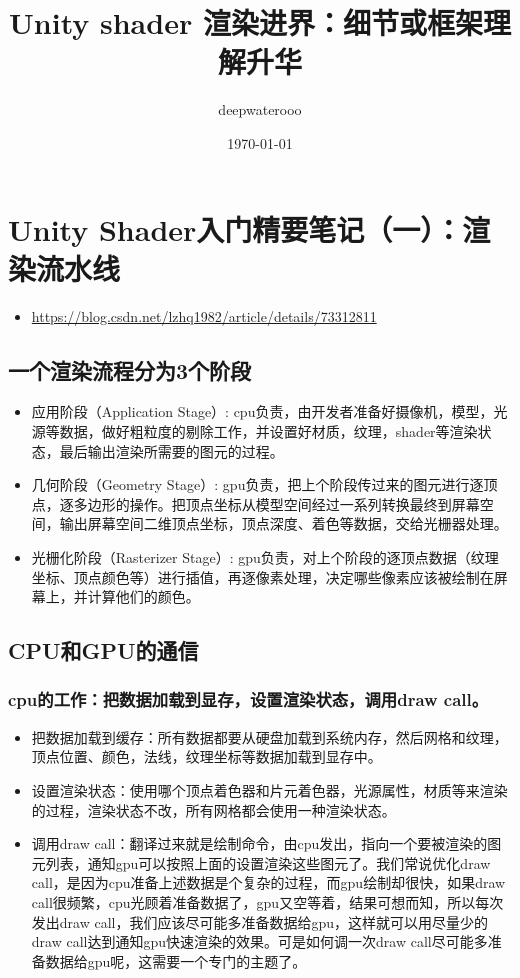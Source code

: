 \documentclass[9pt, b5paper]{article}
\author{deepwaterooo}
\date{\today}
\title{Unity shader 渲染进界：细节或框架理解升华}
\begin{document}
\maketitle
\tableofcontents


\section{Unity Shader入门精要笔记（一）：渲染流水线}
\label{sec-1}
\begin{itemize}
\item \url{https://blog.csdn.net/lzhq1982/article/details/73312811}
\end{itemize}
\subsection{一个渲染流程分为3个阶段}
\label{sec-1-1}
\begin{itemize}
\item 应用阶段（Application Stage）: cpu负责，由开发者准备好摄像机，模型，光源等数据，做好粗粒度的剔除工作，并设置好材质，纹理，shader等渲染状态，最后输出渲染所需要的图元的过程。
\item 几何阶段（Geometry Stage）: gpu负责，把上个阶段传过来的图元进行逐顶点，逐多边形的操作。把顶点坐标从模型空间经过一系列转换最终到屏幕空间，输出屏幕空间二维顶点坐标，顶点深度、着色等数据，交给光栅器处理。
\item 光栅化阶段（Rasterizer Stage）: gpu负责，对上个阶段的逐顶点数据（纹理坐标、顶点颜色等）进行插值，再逐像素处理，决定哪些像素应该被绘制在屏幕上，并计算他们的颜色。
\end{itemize}
\subsection{CPU和GPU的通信}
\label{sec-1-2}
\subsubsection{cpu的工作：把数据加载到显存，设置渲染状态，调用draw call。}
\label{sec-1-2-1}
\begin{itemize}
\item 把数据加载到缓存：所有数据都要从硬盘加载到系统内存，然后网格和纹理，顶点位置、颜色，法线，纹理坐标等数据加载到显存中。
\item 设置渲染状态：使用哪个顶点着色器和片元着色器，光源属性，材质等来渲染的过程，渲染状态不改，所有网格都会使用一种渲染状态。
\item 调用draw call：翻译过来就是绘制命令，由cpu发出，指向一个要被渲染的图元列表，通知gpu可以按照上面的设置渲染这些图元了。我们常说优化draw call，是因为cpu准备上述数据是个复杂的过程，而gpu绘制却很快，如果draw call很频繁，cpu光顾着准备数据了，gpu又空等着，结果可想而知，所以每次发出draw call，我们应该尽可能多准备数据给gpu，这样就可以用尽量少的draw call达到通知gpu快速渲染的效果。可是如何调一次draw call尽可能多准备数据给gpu呢，这需要一个专门的主题了。
\end{itemize}
\end{document}
